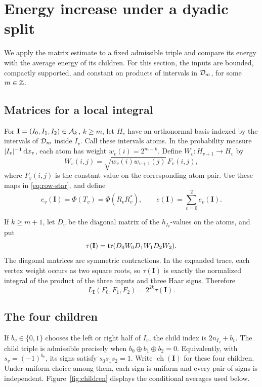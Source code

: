 \section{Energy increase under a dyadic split}\label{sec:dyadic}

We apply the matrix estimate to a fixed admissible triple and compare
its energy with the average energy of its children. For this section,
the inputs are bounded, compactly supported, and constant on products
of intervals in \(\mathcal D_m\), for some \(m\in\mathbb Z\).

\subsection{Matrices for a local integral}

For \(\mathbf I=(I_0,I_1,I_2)\in\mathcal A_k\), \(k\ge m\), let \(H_v\)
have an orthonormal basis indexed by the intervals of \(\mathcal D_m\)
inside \(I_v\). Call these intervals atoms. In the probability measure
\(\lvert I_v\rvert^{-1}\,\mathrm d x_v\), each atom has weight
\(w_v(i)=2^{m-k}\).
Define \(W_v:H_{v+1}\to H_v\) by
\begin{equation}\label{eq:weighted-edge}
 W_v(i,j)=\sqrt{w_v(i)w_{v+1}(j)}\,F_v(i,j),
\end{equation}
where \(F_v(i,j)\) is the constant value on the corresponding atom
pair. Use these maps in \eqref{eq:row-star}, and define
\begin{equation}\label{eq:local-energy}
 e_v(\mathbf I)=\Phi(T_v)=\Phi(R_vR_v^*),
 \qquad e(\mathbf I)=\sum_{v=0}^2 e_v(\mathbf I).
\end{equation}

If \(k\ge m+1\), let \(D_v\) be the diagonal matrix of the
\(h_{I_v}\)-values on the atoms, and put
\[
 \tau(\mathbf I)=\operatorname{tr}(D_0W_0D_1W_1D_2W_2).
\]
The diagonal matrices are symmetric contractions. In the expanded
trace, each vertex weight occurs as two square roots, so
\(\tau(\mathbf I)\) is exactly the normalized integral of the product
of the three inputs and three Haar signs. Therefore
\begin{equation}\label{eq:trace-integral}
 L_{\mathbf I}(F_0,F_1,F_2)=2^{2k}\tau(\mathbf I).
\end{equation}

\subsection{The four children}

If \(b_v\in\{0,1\}\) chooses the left or right half of \(I_v\), the
child index is \(2n_{I_v}+b_v\). The child triple is admissible
precisely when \(b_0\oplus b_1\oplus b_2=0\). Equivalently, with
\(s_v=(-1)^{b_v}\), its signs satisfy \(s_0s_1s_2=1\).
Write \(\operatorname{ch}(\mathbf I)\) for these four children.
Under uniform choice among them, each sign is uniform and every pair
of signs is independent. Figure~\ref{fig:children} displays the
conditional averages used below.

